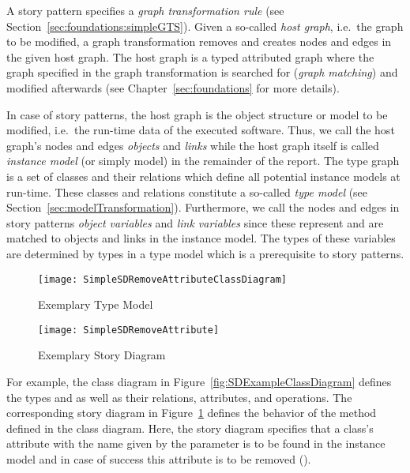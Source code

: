 A story pattern specifies a \emph{graph transformation rule} \cite{Roz97} (see Section~\ref{sec:foundations:simpleGTS}).
Given a so-called \emph{host graph}, i.e.\ the graph to be modified, a graph transformation removes and creates nodes and edges in the given host graph.
The host graph is a typed attributed graph where the graph specified in the graph transformation is searched for (\emph{graph matching}) and modified afterwards
(see Chapter~\ref{sec:foundations} for more details).

In case of story patterns, the host graph is the object structure or model to be modified, i.e.\ the run-time data of the executed software.
Thus, we call the host graph's nodes and edges \emph{objects} and \emph{links}
while the host graph itself is called \emph{instance model} (or simply model) in the remainder of the report.
The type graph is a set of classes and their relations which define all potential instance models at run-time.
These classes and relations constitute a so-called \emph{type model} (see Section~\ref{sec:modelTransformation}).
Furthermore, we call the nodes and edges in story patterns \emph{object variables} and \emph{link variables}
since these represent and are matched to objects and links in the instance model.
The types of these variables are determined by types in a type model which is a prerequisite to story patterns.

\begin{figure}[htb]
	\centering
  \begin{minipage}[t]{.4\textwidth}
    \centering
    \texttt{[image: SimpleSDRemoveAttributeClassDiagram]} 
    \caption{Exemplary Type Model}
    \label{fig:SDExampleClassDiagram}
  \end{minipage}%
  \hfill
  \begin{minipage}[t]{.55\textwidth}
    \centering
    \texttt{[image: SimpleSDRemoveAttribute]}
    \caption{Exemplary Story Diagram}
    \label{fig:SDExampleStoryDiagram}
  \end{minipage}
\end{figure}


For example, the class diagram in Figure~\ref{fig:SDExampleClassDiagram} defines the types  and  as well as their relations, attributes, and operations.
The corresponding story diagram in Figure~\ref{fig:SDExampleStoryDiagram} defines the behavior of the  method defined in the class diagram.
Here, the story diagram specifies that a class's attribute with the name given by the parameter  is to be found in the instance model and in case of success this attribute is to be removed (\destroy).


